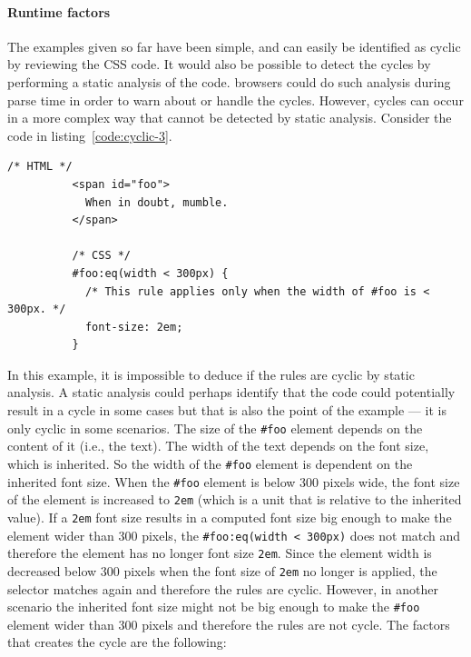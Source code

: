 \documentclass[a4paper,11pt]{kth-mag}
\newcommand{\code}[1]{\texttt{#1}}
\begin{document}
        \paragraph{Runtime factors}
        The examples given so far have been simple, and can easily be identified as cyclic by reviewing the \gls{CSS} code.
        It would also be possible to detect the cycles by performing a static analysis of the code.
        \Glspl{browser} could do such analysis during parse time in order to warn about or handle the cycles.
        However, cycles can occur in a more complex way that cannot be detected by static analysis.
        Consider the code in listing~\ref{code:cyclic-3}.
        \begin{lstlisting}[gobble=10,caption={Example of cyclic rules that cannot be detected by static analysis.}, captionpos=b, label={code:cyclic-3}]
          /* HTML */
          <span id="foo">
            When in doubt, mumble.
          </span>

          /* CSS */
          #foo:eq(width < 300px) {
            /* This rule applies only when the width of #foo is < 300px. */
            font-size: 2em;
          }
        \end{lstlisting}
        In this example, it is impossible to deduce if the rules are cyclic by static analysis.
        A static analysis could perhaps identify that the code could potentially result in a cycle in some cases but that is also the point of the example --- it is only cyclic in some scenarios.
        The size of the \code{\#foo} element depends on the content of it (i.e., the text).
        The width of the text depends on the font size, which is inherited.
        So the width of the \code{\#foo} \gls{element} is dependent on the inherited font size.
        When the \code{\#foo} \gls{element} is below 300 pixels wide, the font size of the element is increased to \code{2em} (which is a unit that is relative to the inherited value).
        If a \code{2em} font size results in a computed font size big enough to make the \gls{element} wider than 300 pixels, the \code{\#foo:eq(width < 300px)} does not match and therefore the element has no longer font size \code{2em}.
        Since the element width is decreased below 300 pixels when the font size of \code{2em} no longer is applied, the selector matches again and therefore the rules are cyclic.
        However, in another scenario the inherited font size might not be big enough to make the \code{\#foo} element wider than 300 pixels and therefore the rules are not cycle.
        The factors that creates the cycle are the following:
\end{document}
